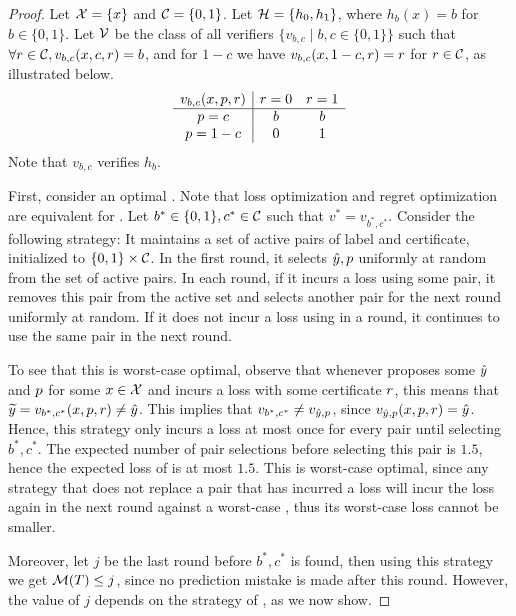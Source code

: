 \documentclass[anon]{alt2027} %
\begin{document}
\begin{proof}
Let ${\mathcal X} = \{x\}$ and ${{\mathcal C}} = \{0,1\}$. Let ${{\mathcal H}} = \{h_0,h_1\}$, where $h_b(x) = b$ for  $b\in\{0,1\}$. Let ${\mathcal V}$ be the class of all verifiers $\{ v_{b,c} \mid b,c \in \{0,1\}\}$  such that $\forall {r} \in {{\mathcal C}}, v_{b,c}(x,c,{r}) = b$, and for $1-c$ we have $v_{b,c}(x,1-c,{r}) = {r}$ for ${r} \in {{\mathcal C}}$, as illustrated below.
\[
\begin{array}{c|cc}
 v_{b,c}(x,{p},{r}) & {r}=0 & {r}=1\\
\hline
{p}=c & b & b\\
{p} = 1-c & 0 & 1
\end{array}
\]
Note that $v_{b,c}$ verifies $h_b$. 

First, consider an optimal \dt. Note that loss optimization and regret optimization are equivalent for \dt. Let $b^* \in \{0,1\},c^*\in {{\mathcal C}}$ such that $v^* = v_{b^*,c^*}$. Consider the following \dt strategy: It maintains a set of active pairs of label and certificate, initialized to $\{0,1\}\times {{\mathcal C}}$. In the first round, it selects ${\hat{y}},{p}$ uniformly at random from the set of active pairs. In each round, if it incurs a loss using some pair, it removes this pair from the active set and selects another pair for the next round uniformly at random. If it does not incur a loss using in a round, it continues to use the same pair in the next round. 

To see that this is worst-case optimal, observe that whenever \dt proposes some ${\hat{y}}$ and ${p}$ for some $x \in {\mathcal X}$ and incurs a loss with some \df certificate ${r}$, this means that 
${\widetilde{y}} = v_{b^*,c^*}(x,{p},{r}) \neq {\hat{y}}$. This implies that $v_{b^*, c^*} \neq v_{{\hat{y}},{p}}$, since $v_{{\hat{y}},{p}}(x,{p},{r}) = {\hat{y}}$. Hence, this \dt strategy only incurs a loss at most once for every pair until selecting $b^*, c^*$. The expected number of pair selections before selecting this pair is $1.5$, hence the expected loss of \dt is at most $1.5$. This is worst-case optimal, since any strategy that does not replace a pair that has incurred a loss will incur the loss again in the next round against a worst-case \df, thus its worst-case loss cannot be smaller.

Moreover, let $j$ be the last round before $b^*,c^*$ is found, then using this \dt strategy we get ${\mathcal M}(T) \leq j$, since no prediction mistake is made after this round. However, the value of $j$ depends on the strategy of \df, as we now show.


\end{proof}
\end{document}
